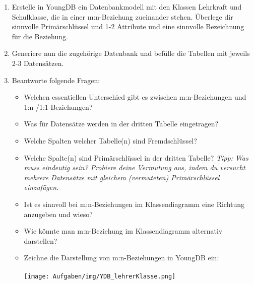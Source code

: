 
\begin{enumerate}
    \item Erstelle in YoungDB ein Datenbankmodell mit den Klassen Lehrkraft und Schulklasse, die in einer m:n-Beziehung zueinander stehen. Überlege dir sinnvolle Primärschlüssel und 1-2 Attribute und eine sinnvolle Bezeichnung für die Beziehung.
    \item Generiere nun die zugehörige Datenbank und befülle die Tabellen mit jeweils 2-3 Datensätzen.
    \item Beantworte folgende Fragen:\begin{itemize}
        \item Welchen essentiellen Unterschied gibt es zwischen m:n-Beziehungen und 1:n-/1:1-Beziehungen?\\
        \item Was für Datensätze werden in der dritten Tabelle eingetragen?\\
        \item Welche Spalten welcher Tabelle(n) sind Fremdschlüssel?\\
        \item Welche Spalte(n) sind Primärschlüssel in der dritten Tabelle? \emph{Tipp: Was muss eindeutig sein? Probiere deine Vermutung aus, indem du versucht mehrere Datensätze mit gleichem (vermuteten) Primärschlüssel einzufügen.} 
        \\
        \item Ist es sinnvoll bei m:n-Beziehungen im Klassendiagramm eine Richtung anzugeben und wieso?
        \\
        \item Wie könnte man m:n-Beziehung im Klassendiagramm alternativ darstellen?
        \\
        \item Zeichne die Darstellung von m:n-Beziehungen in YoungDB ein:\\\\
        \texttt{[image: Aufgaben/img/YDB\_lehrerKlasse.png]}
    \end{itemize}
\end{enumerate} 